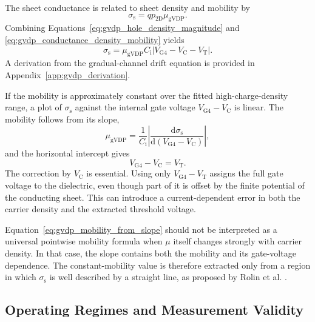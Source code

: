 The sheet conductance is related to sheet density and mobility by
\begin{equation}
    \sigma_\mathrm{s}=q p_\mathrm{2D}\mu_\mathrm{gVDP}.
    \label{eq:gvdp_conductance_density_mobility}
\end{equation}
Combining Equations~\eqref{eq:gvdp_hole_density_magnitude} and
\eqref{eq:gvdp_conductance_density_mobility} yields
\begin{equation}
    \sigma_\mathrm{s}
    =\mu_\mathrm{gVDP}C_\mathrm{i}
    \left|V_\mathrm{G4}-V_\mathrm{C}-V_\mathrm{T}\right|.
    \label{eq:gvdp_sheet_conductance_gate_voltage}
\end{equation}
A derivation from the gradual-channel drift equation is provided in
Appendix~\ref{app:gvdp_derivation}.

If the mobility is approximately constant over the fitted high-charge-density
range, a plot of $\sigma_\mathrm{s}$ against the internal gate voltage
$V_\mathrm{G4}-V_\mathrm{C}$ is linear. The mobility follows from its slope,
\begin{equation}
    \mu_\mathrm{gVDP}
    =\frac{1}{C_\mathrm{i}}
    \left|
    \frac{\mathrm{d}\sigma_\mathrm{s}}
    {\mathrm{d}\left(V_\mathrm{G4}-V_\mathrm{C}\right)}
    \right|,
    \label{eq:gvdp_mobility_from_slope}
\end{equation}
and the horizontal intercept gives
\begin{equation}
    V_\mathrm{G4}-V_\mathrm{C}=V_\mathrm{T}.
    \label{eq:gvdp_threshold_from_intercept}
\end{equation}
The correction by $V_\mathrm{C}$ is essential. Using only
$V_\mathrm{G4}-V_\mathrm{T}$ assigns the full gate voltage to the dielectric,
even though part of it is offset by the finite potential of the conducting
sheet. This can introduce a current-dependent error in both the carrier density
and the extracted threshold voltage.

Equation~\eqref{eq:gvdp_mobility_from_slope} should not be interpreted as a
universal pointwise mobility formula when $\mu$ itself changes strongly with
carrier density. In that case, the slope contains both the mobility and its
gate-voltage dependence. The constant-mobility value is therefore extracted
only from a region in which $\sigma_\mathrm{s}$ is well described by a straight
line, as proposed by Rolin et al. \cite{Rolin2017GVDP}.

\subsection{Operating Regimes and Measurement Validity}
\label{subsec:gvdp_operating_regimes}

